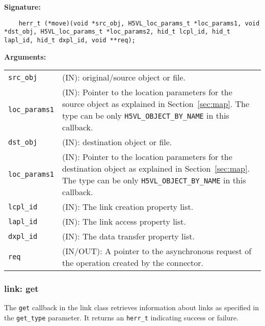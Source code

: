 \begin{mdframed}[style=bgbox]
\textbf{Signature:}
\begin{lstlisting}
    herr_t (*move)(void *src_obj, H5VL_loc_params_t *loc_params1, void *dst_obj, H5VL_loc_params_t *loc_params2, hid_t lcpl_id, hid_t lapl_id, hid_t dxpl_id, void **req);
\end{lstlisting}

\textbf{Arguments:}\\
\begin{tabular}{l p{13.5cm}}
  \texttt{src\_obj} & (IN): original/source object or file. \\
  \texttt{loc\_params1} & (IN): Pointer to the location parameters for the source
  object as explained in Section~\ref{sec:map}. The type can be only \texttt{H5VL\_OBJECT\_BY\_NAME} in this callback. \\
  \texttt{dst\_obj} & (IN): destination object or file. \\
  \texttt{loc\_params1} & (IN): Pointer to the location parameters for the destination
  object as explained in Section~\ref{sec:map}. The type can be only \texttt{H5VL\_OBJECT\_BY\_NAME} in this callback. \\
  \texttt{lcpl\_id} & (IN): The link creation property list.\\
  \texttt{lapl\_id} & (IN): The link access property list.\\
  \texttt{dxpl\_id} & (IN): The data transfer property list.\\
  \texttt{req} & (IN/OUT): A pointer to the asynchronous request of the
  operation created by the connector.\\
\end{tabular}
\end{mdframed}

\subsubsection{link: get}
The \texttt{get} callback in the link class retrieves information
about links as specified in the \texttt{get\_type} parameter. It
returns an \texttt{herr\_t} indicating success or failure.\bigskip

